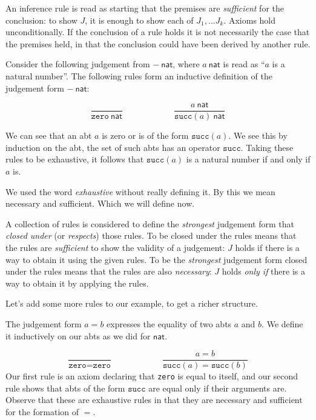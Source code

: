 \begin{remark}
    An inference rule is read as starting that the premises are \emph{sufficient} for the conclusion: to show $J$, it is enough to show each of $J_1, \dots J_k$. Axioms hold unconditionally. If the conclusion of a rule holds it is not necessarily the case that the premises held, in that the conclusion could have been derived by another rule.
\end{remark}

\begin{example}
    Consider the following judgement from $-\ \mathsf{nat}$, where $a\ \mathsf{nat}$ is read as ``$a$ is a natural number''. The following rules form an inductive definition of the judgement form $-\ \mathsf{nat}$:

    $$\frac
        {}
        {\texttt{zero}\ \mathsf{nat}}
      \qquad\qquad\qquad
      \frac
        {a\ \mathsf{nat}}
        {\texttt{succ}(a)\ \mathsf{nat}}
    $$

    We can see that an abt $a$ is zero or is of the form $\texttt{succ}(a)$. We see this by induction on the abt, the set of such abts has an operator $\texttt{succ}$. Taking these rules to be exhaustive, it follows that $\texttt{succ}(a)$ is a natural number if and only if $a$ is.
\end{example}

\begin{remark}
    We used the word \emph{exhaustive} without really defining it. By this we mean necessary and sufficient. Which we will define now.
\end{remark}

\begin{defin}
    A collection of rules is considered to define the \emph{strongest} judgement form that \emph{closed under} (or \emph{respects}) those rules. To be closed under the rules means that the rules are \emph{sufficient} to show the validity of a judgement: $J$ holds if there is a way to obtain it using the given rules. To be the \emph{strongest} judgement form closed under the rules means that the rules are also \emph{necessary}: $J$ holds \emph{only if} there is a way to obtain it by applying the rules.
\end{defin}

Let's add some more rules to our example, to get a richer structure.

\begin{example}
    The judgement form $a = b$ expresses the equality of two abts $a$ and $b$. We define it inductively on our abts as we did for $\mathsf{nat}$.
    
    $$\frac
        {}
        {\texttt{zero} = \texttt{zero}}
      \qquad\qquad\qquad
    \frac
        {a = b}
        {\texttt{succ}(a) = \texttt{succ}(b)}
    $$
    Our first rule is an axiom declaring that \texttt{zero} is equal to itself, and our second rule shows that abts of the form $\texttt{succ}$ are equal only if their arguments are. Observe that these are exhaustive rules in that they are necessary and sufficient for the formation of $=$.
\end{example}

